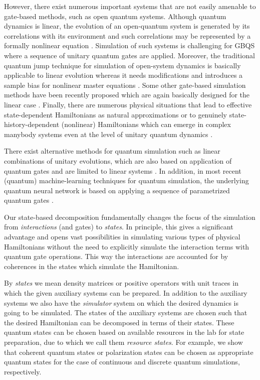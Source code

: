 \documentclass[aps,pra,twocolumn,floatfix,groupedaddress,superscriptaddress,nofootinbib,notitlepage]{revtex4-2}
\begin{document}
However, there exist numerous important systems that are not easily amenable to gate-based methods, such as open quantum systems. Although quantum dynamics is linear, the evolution of an open-quantum system is generated by its correlations with its environment and such correlations may be represented by a formally nonlinear equation \cite{CorrPic}. Simulation of such systems is challenging for GBQS where a sequence of unitary quantum gates are applied. Moreover, the traditional quantum jump technique for simulation of open-system dynamics is basically applicable to linear evolution \cite{unraveling, unravelingNM} whereas it needs modifications and introduces a sample bias for nonlinear master equations \cite{Molmer-NME, Molmer-NME2}. Some other gate-based simulation methods have been recently proposed which are again basically designed for the linear case \cite{qChannel-4Unitary, LinearCombH}. Finally, there are numerous physical situations that lead to effective state-dependent Hamiltonians as natural approximations \cite{book:Kowalski, Gross-Pitaevskii, Kaplan} or to genuinely state-history-dependent (nonlinear) Hamiltonians which can emerge in complex manybody systems even at the level of unitary quantum dynamics \cite{ECQT-Tavanfar, ECQT}. 

There exist alternative methods for quantum simulation such as linear combinations of unitary evolutions, which are also based on application of quantum gates and are limited to linear systems \cite{LinCombUnitaries, UltraColdGases}. In addition, in most recent (quantum) machine-learning techniques for quantum simulation, the underlying quantum neural network is based on applying a sequence of parametrized quantum gates \cite{Molmer-learning, gate-based-qML1, gate-based-qML2, gate-based-qML3, Krenn}.  

Our state-based decomposition fundamentally changes the focus of the simulation from \textit{interactions} (and gates) to \textit{states}. In principle, this gives a significant advantage and opens vast possibilities in simulating various types of physical Hamiltonians without the need to explicitly simulate the interaction terms with quantum gate operations. This way the interactions are accounted for by coherences in the states which simulate the Hamiltonian.

By \textit{states} we mean density matrices or positive operators with unit traces in which the given auxiliary systems can be prepared. In addition to the auxiliary systems we also have the \textit{simulator} system on which the desired dynamics is going to be simulated. The states of the auxiliary systems are chosen such that the desired Hamiltonian can be decomposed in terms of their states. These quantum states can be chosen based on available 
resources in the lab for state preparation, due to which we call them \textit{resource states}. For example, we show that coherent quantum states or polarization states \cite{polarization-states} can be chosen as appropriate quantum states for the case of continuous and discrete quantum simulations, respectively. 
 
\end{document}
